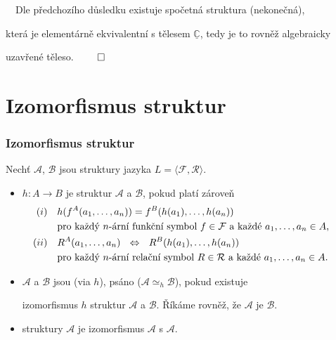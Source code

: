 {\it {}}\ \ Dle předchozího důsledku existuje spočetná struktura (nekonečná),
\smallskip

která je elementárně ekvivalentní s tělesem $\underline{\mathbb{C}}$, tedy je to rovněž algebraicky
\smallskip

uzavřené těleso. $\qed$


\section{Izomorfismus struktur}\label{section:isomorphism-of-structures}\todo

\subsubsection*{Izomorfismus struktur}
    
    Nechť $\mathcal{A}$, $\mathcal{B}$ jsou struktury jazyka $L=\langle\mathcal{F},\mathcal{R}\rangle$.
    \smallskip
    
    \begin{itemize}
    \item {} $h\colon A\to B$ je  struktur $\mathcal{A}$ a $\mathcal{B}$, pokud platí zároveň
    \vspace{-2mm}
    \begin{align*}\myblue{(i)}\quad&\mygreen{h(f^A(a_1,\dots,a_n))=f^B(h(a_1),\dots,h(a_n))}\\
    &\text{pro každý $n$-ární funkční symbol $f\in \mathcal{F}$ a každé $a_1,\dots,a_n\in A$,\qquad}\\
    \myblue{(ii)}\quad&\mygreen{R^A(a_1,\dots,a_n)\ \ \Leftrightarrow\ \ R^B(h(a_1),\dots,h(a_n))}\\
    &\text{pro každý $n$-ární relační symbol $R\in \mathcal{R}$ a každé $a_1,\dots,a_n\in A$.}
    \end{align*}
    
    \vspace{-1mm}
    \item $\mathcal{A}$ a $\mathcal{B}$ jsou  (via $h$), psáno  ($\mathcal{A}\simeq_h\mathcal{B}$), pokud existuje
        \smallskip
    
        izomorfismus $h$ struktur $\mathcal{A}$ a $\mathcal{B}$. Říkáme rovněž, že $\mathcal{A}$ je  $\mathcal{B}$.
    \smallskip
    
    \item {} struktury $\mathcal{A}$ je izomorfismus $\mathcal{A}$ s $\mathcal{A}$.
    \end{itemize}
    \medskip
    
